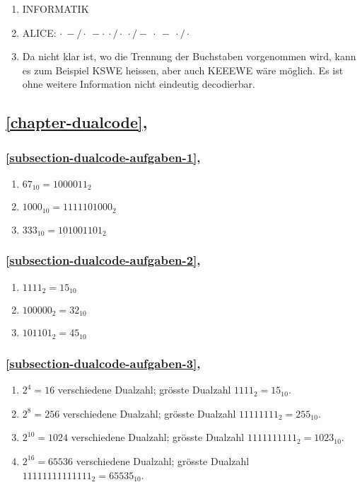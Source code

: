\begin{enumerate}
\item INFORMATIK
\item ALICE: $\cdot~- / \cdot~-\cdot~\cdot / \cdot~\cdot / -~\cdot~-~\cdot / \cdot$
\item Da nicht klar ist, wo die Trennung der Buchstaben vorgenommen wird, kann es zum Beispiel KSWE heissen, aber auch KEEEWE wäre möglich. Es ist ohne weitere Information nicht eindeutig decodierbar.
\end{enumerate}

\subsection{\autoref{chapter-dualcode}, }

\subsubsection{\autoref{subsection-dualcode-aufgaben-1}, }

\begin{enumerate}
\item $67_{10} = 1000011_2$
\item $1000_{10} = 1111101000_2$
\item $333_{10} = 101001101_2$
\end{enumerate}

\subsubsection{\autoref{subsection-dualcode-aufgaben-2}, }

\begin{enumerate}
\item  $1111_2 = 15_{10}$
\item $100000_2 = 32_{10}$
\item $101101_2 = 45_{10}$
\end{enumerate}

\subsubsection{\autoref{subsection-dualcode-aufgaben-3}, }

\begin{enumerate}
\item $2^4 = \num{16}$ verschiedene Dualzahl; grösste Dualzahl $1111_2 = \num{15}_{10}$.
\item $2^8 = \num{256}$ verschiedene Dualzahl; grösste Dualzahl $11111111_2 = \num{255}_{10}$.
\item $2^{10} = \num{1024}$ verschiedene Dualzahl; grösste Dualzahl $1111111111_2 = \num{1023}_{10}$.
\item $2^{16} = \num{65536}$ verschiedene Dualzahl; grösste Dualzahl $11111111111111_2 = \num{65535}_{10}$.
\end{enumerate}

